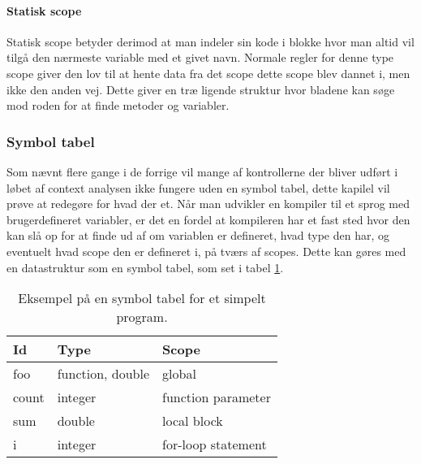     \paragraph{Statisk scope} Statisk scope betyder derimod at man indeler sin kode i blokke hvor man altid vil tilgå den nærmeste variable med et givet navn. Normale regler for denne type scope giver den lov til at hente data fra det scope dette scope blev dannet i, men ikke den anden vej. Dette giver en træ ligende struktur hvor bladene kan søge mod roden for at finde metoder og variabler.


    
    
\subsubsection{Symbol tabel}
    Som nævnt flere gange i de forrige vil mange af kontrollerne der bliver udført i løbet af context analysen ikke fungere uden en symbol tabel, dette kapilel vil prøve at redegøre for hvad der et. Når man udvikler en kompiler til et sprog med brugerdefineret variabler, er det en fordel at kompileren har et fast sted hvor den kan slå op for at finde ud af om variablen er defineret, hvad type den har, og eventuelt hvad scope den er defineret i, på tværs af scopes. Dette kan gøres med en datastruktur som en symbol tabel, som set i tabel \ref{tab:symboltabel}.
    

    \begin{table}[H]
    \centering\footnotesize
    \begin{tabular}{l|l|l}
    \textbf{Id} & \textbf{Type} & \textbf{Scope} \\\bottomrule
    foo & function, double & global\\
    count & integer & function parameter\\
    sum & double & local block\\
    i & integer & for-loop statement
    \end{tabular}
    \caption{Eksempel på en symbol tabel for et simpelt program.}
    \label{tab:symboltabel}
    \end{table}
    
